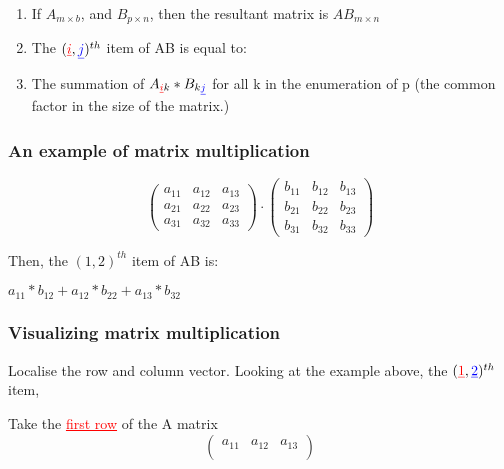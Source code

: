 \documentclass{article}
\newcommand{\bul}[1]{\textcolor{blue}{\underline{#1}}}
\newcommand{\rul}[1]{\textcolor{red}{\underline{#1}}}
\begin{document}
\begin{enumerate}
    \item If $A_{m\times b}$, and $B_{p\times n}$, then the resultant matrix is $AB_{m\times n}$
    \item The $(\rul{i},\bul{j})^{th}$ item of AB is equal to:
    \item[] The summation of $A_{\rul{i}k} * B_{k\bul{j}}$ for all k in the enumeration of p (the common factor in the size of the matrix.)
\end{enumerate}

\subsubsection{An example of matrix multiplication}

\[
\begin{pmatrix}
a_{11} & a_{12} & a_{13} \\
a_{21} & a_{22} & a_{23} \\ 
a_{31} & a_{32} & a_{33}
\end{pmatrix}
\cdot
\begin{pmatrix}
b_{11} & b_{12} & b_{13} \\
b_{21} & b_{22} & b_{23} \\ 
b_{31} & b_{32} & b_{33}
\end{pmatrix}
\]

Then, the $(1,2)^{th}$ item of AB is:
\begin{center}
    $a_{11}*b_{12} + a_{12}*b_{22} + a_{13}*b_{32}$
\end{center}

\vspace{10pt}

\subsubsection{Visualizing matrix multiplication}

Localise the row and column vector. Looking at the example above, the $(\textcolor{red}{\underline{1}},\bul{2})^{th}$ item,

\vspace{10pt}

Take the \textcolor{red}{\underline{first row}} of the A matrix
\[
\begin{pmatrix}
    a_{11} & a_{12} & a_{13} \\
\end{pmatrix}
\]

\vspace{10pt}
\end{document}
